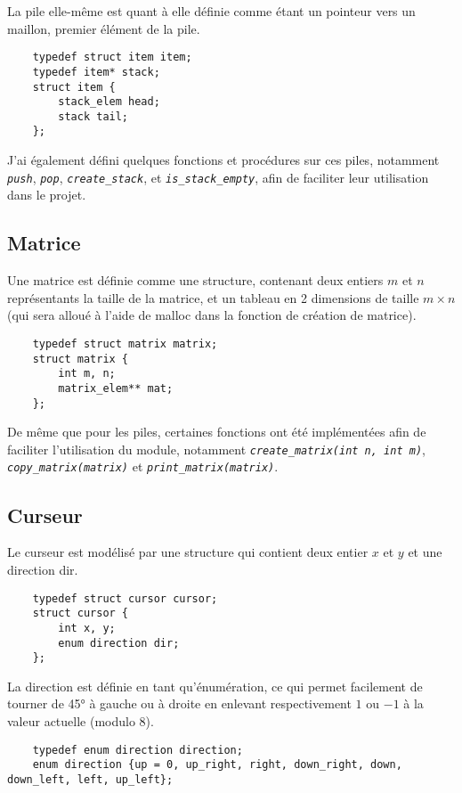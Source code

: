 \documentclass[a4paper,11pt]{article}
\newcommand{\code}[1]{{\itshape\lstinline{#1}}}
\begin{document}
La pile elle-même est quant à elle définie comme étant un pointeur vers un maillon, premier élément de la pile.

\begin{lstlisting}
    typedef struct item item;
    typedef item* stack;
    struct item {
        stack_elem head;
        stack tail;
    };
\end{lstlisting}

J'ai également défini quelques fonctions et procédures sur ces piles, notamment \code{push}, \code{pop}, \code{create_stack}, et \code{is_stack_empty}, afin de faciliter leur utilisation dans le projet.

\subsection*{Matrice}
Une matrice est définie comme une structure, contenant deux entiers $m$ et $n$ représentants la taille de la matrice, et un tableau en 2 dimensions de taille $m \times n$ (qui sera alloué à l'aide de malloc dans la fonction de création de matrice).

\begin{lstlisting}
    typedef struct matrix matrix;
    struct matrix {
        int m, n;
        matrix_elem** mat;
    };
\end{lstlisting}

De même que pour les piles, certaines fonctions ont été implémentées afin de faciliter l'utilisation du module, notamment \code{create_matrix(int n, int m)}, \code{copy_matrix(matrix)} et \code{print_matrix(matrix)}.

\subsection*{Curseur}
Le curseur est modélisé par une structure qui contient deux entier $x$ et $y$ et une direction dir.
\begin{lstlisting}
    typedef struct cursor cursor;
    struct cursor {
        int x, y;
        enum direction dir;
    };
\end{lstlisting}

La direction est définie en tant qu'énumération, ce qui permet facilement de tourner de 45° à gauche ou à droite en enlevant respectivement $1$ ou $-1$ à la valeur actuelle (modulo 8).
\begin{lstlisting}
    typedef enum direction direction;
    enum direction {up = 0, up_right, right, down_right, down, down_left, left, up_left};
\end{lstlisting}
\end{document}
